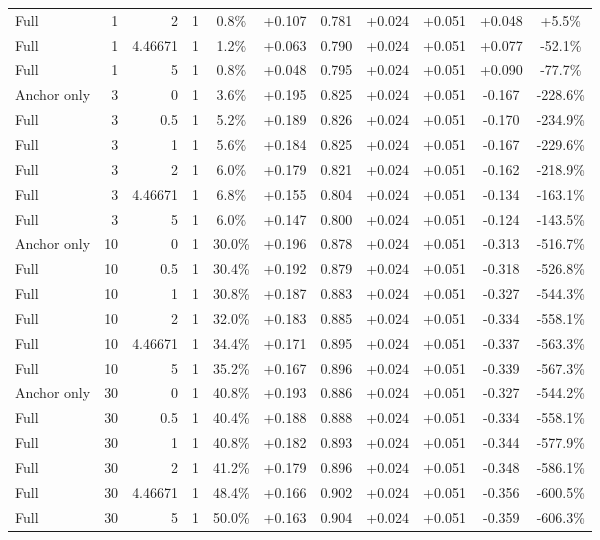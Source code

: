 \begin{table}[htbp]
\begin{tabular}{lrrrccccccc}
Full & 1 & 2 & 1 & 0.8\% & +0.107 & 0.781 & +0.024 & +0.051 & +0.048 & +5.5\% \\
Full & 1 & 4.46671 & 1 & 1.2\% & +0.063 & 0.790 & +0.024 & +0.051 & +0.077 & -52.1\% \\
Full & 1 & 5 & 1 & 0.8\% & +0.048 & 0.795 & +0.024 & +0.051 & +0.090 & -77.7\% \\
Anchor only & 3 & 0 & 1 & 3.6\% & +0.195 & 0.825 & +0.024 & +0.051 & -0.167 & -228.6\% \\
Full & 3 & 0.5 & 1 & 5.2\% & +0.189 & 0.826 & +0.024 & +0.051 & -0.170 & -234.9\% \\
Full & 3 & 1 & 1 & 5.6\% & +0.184 & 0.825 & +0.024 & +0.051 & -0.167 & -229.6\% \\
Full & 3 & 2 & 1 & 6.0\% & +0.179 & 0.821 & +0.024 & +0.051 & -0.162 & -218.9\% \\
Full & 3 & 4.46671 & 1 & 6.8\% & +0.155 & 0.804 & +0.024 & +0.051 & -0.134 & -163.1\% \\
Full & 3 & 5 & 1 & 6.0\% & +0.147 & 0.800 & +0.024 & +0.051 & -0.124 & -143.5\% \\
Anchor only & 10 & 0 & 1 & 30.0\% & +0.196 & 0.878 & +0.024 & +0.051 & -0.313 & -516.7\% \\
Full & 10 & 0.5 & 1 & 30.4\% & +0.192 & 0.879 & +0.024 & +0.051 & -0.318 & -526.8\% \\
Full & 10 & 1 & 1 & 30.8\% & +0.187 & 0.883 & +0.024 & +0.051 & -0.327 & -544.3\% \\
Full & 10 & 2 & 1 & 32.0\% & +0.183 & 0.885 & +0.024 & +0.051 & -0.334 & -558.1\% \\
Full & 10 & 4.46671 & 1 & 34.4\% & +0.171 & 0.895 & +0.024 & +0.051 & -0.337 & -563.3\% \\
Full & 10 & 5 & 1 & 35.2\% & +0.167 & 0.896 & +0.024 & +0.051 & -0.339 & -567.3\% \\
Anchor only & 30 & 0 & 1 & 40.8\% & +0.193 & 0.886 & +0.024 & +0.051 & -0.327 & -544.2\% \\
Full & 30 & 0.5 & 1 & 40.4\% & +0.188 & 0.888 & +0.024 & +0.051 & -0.334 & -558.1\% \\
Full & 30 & 1 & 1 & 40.8\% & +0.182 & 0.893 & +0.024 & +0.051 & -0.344 & -577.9\% \\
Full & 30 & 2 & 1 & 41.2\% & +0.179 & 0.896 & +0.024 & +0.051 & -0.348 & -586.1\% \\
Full & 30 & 4.46671 & 1 & 48.4\% & +0.166 & 0.902 & +0.024 & +0.051 & -0.356 & -600.5\% \\
Full & 30 & 5 & 1 & 50.0\% & +0.163 & 0.904 & +0.024 & +0.051 & -0.359 & -606.3\% \\

\end{tabular}
\end{table}
